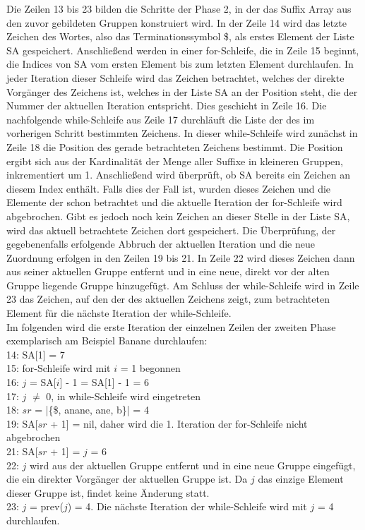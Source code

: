 Die Zeilen 13 bis 23 bilden die Schritte der Phase 2, in der das Suffix Array aus den zuvor gebildeten Gruppen konstruiert wird. In der Zeile 14 wird das letzte Zeichen des Wortes, also das Terminationssymbol \$, als erstes Element der Liste SA gespeichert. Anschlie{\ss}end werden in einer for-Schleife, die in Zeile 15 beginnt, die Indices von SA vom ersten Element bis zum letzten Element durchlaufen. In jeder Iteration dieser Schleife wird das Zeichen betrachtet, welches der direkte Vorg{\"a}nger des Zeichens ist, welches in der Liste SA an der Position steht, die der Nummer der aktuellen Iteration entspricht. Dies geschieht in Zeile 16. Die nachfolgende while-Schleife aus Zeile 17 durchl{\"a}uft die Liste der \prevpointer des im vorherigen Schritt bestimmten Zeichens. In dieser while-Schleife wird zun{\"a}chst in Zeile 18 die Position des gerade betrachteten Zeichens bestimmt. Die Position ergibt sich aus der Kardinalit{\"a}t der Menge aller Suffixe in kleineren Gruppen, inkrementiert um 1. Anschlie{\ss}end wird {\"u}berpr{\"u}ft, ob SA bereits ein Zeichen an diesem Index enth{\"a}lt. Falls dies der Fall ist, wurden dieses Zeichen und die Elemente der \prevpointer schon betrachtet und die aktuelle Iteration der for-Schleife wird abgebrochen. Gibt es jedoch noch kein Zeichen an dieser Stelle in der Liste SA, wird das aktuell betrachtete Zeichen dort gespeichert. Die {\"U}berpr{\"u}fung, der gegebenenfalls erfolgende Abbruch der aktuellen Iteration und die neue Zuordnung erfolgen in den Zeilen 19 bis 21. 
In Zeile 22 wird dieses Zeichen dann aus seiner aktuellen Gruppe entfernt und in eine neue, direkt vor der alten Gruppe liegende Gruppe hinzugef{\"u}gt.
Am Schluss der while-Schleife wird in Zeile 23 das Zeichen, auf den der \prevpointer des aktuellen Zeichens zeigt, zum betrachteten Element f{\"u}r die n{\"a}chste Iteration der while-Schleife.\\

Im folgenden wird die erste Iteration der einzelnen Zeilen der zweiten Phase exemplarisch am Beispiel Banane durchlaufen:\\
14: 	SA[1] = 7\\
15:	for-Schleife wird mit $i$ = 1 begonnen\\
16:	$j$ = SA[$i$] - 1 = SA[1] - 1 = 6\\
17:	$j$ $\neq$ 0, in while-Schleife wird eingetreten\\
18:	$sr$ = |\{\$, anane, ane, b\}| = 4\\
19:	SA[$sr$ + 1] = nil, daher wird die 1. Iteration der for-Schleife nicht abgebrochen\\
21:	SA[$sr$ + 1] = $j$ = 6\\
22: 	$j$ wird aus der aktuellen Gruppe entfernt und in eine neue Gruppe eingef{\"u}gt, die ein direkter Vorg{\"a}nger der aktuellen Gruppe ist. Da $j$ das einzige Element dieser Gruppe ist, findet keine {\"A}nderung statt.\\
23:	$j$ = prev($j$) = 4. Die n{\"a}chste Iteration der while-Schleife wird mit $j$ = 4 durchlaufen.


